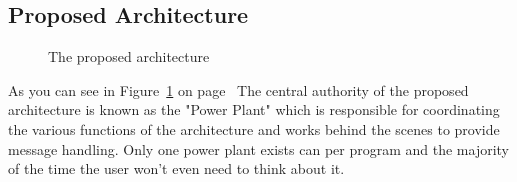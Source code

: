 \documentclass[english,12pt]{scrartcl}
\begin{document}
            
        \subsection{Proposed Architecture}
            \begin{figure}[h]
                \centering
                \caption {The proposed architecture}
                \label{fig:HighLevelProposedArchitecture}
            \end{figure}

            As you can see in Figure~\ref{fig:HighLevelProposedArchitecture} on page~\pageref{fig:HighLevelProposedArchitecture} 
            The central authority of the proposed architecture is known as the "Power Plant" which
            is responsible for coordinating the various functions of the architecture and works
            behind the scenes to provide message handling. Only one power plant exists can per
            program and the majority of the time the user won't even need to think about it. 
            
\end{document}
